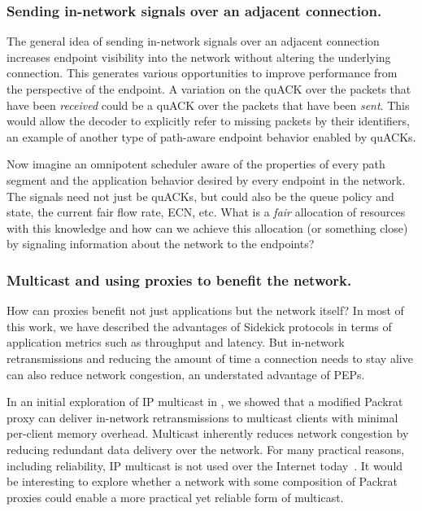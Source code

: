 \subsubsection{Sending in-network signals over an adjacent connection.}

The general idea of sending in-network signals over an adjacent connection
increases endpoint visibility into the network without altering the underlying
connection. This generates various opportunities to improve performance from
the perspective of the endpoint. A variation on the quACK over the packets that
have been \textit{received} could be a quACK over the packets that have been
\textit{sent}. This would allow the decoder to explicitly refer to missing
packets by their identifiers, an example of another type of path-aware endpoint
behavior enabled by quACKs.

Now imagine an omnipotent scheduler aware of the properties of every path
segment and the application behavior desired by every endpoint in the network.
The signals need not just be quACKs, but could also be the queue policy and
state, the current fair flow rate, ECN, etc. What is a \textit{fair} allocation
of resources with this knowledge and how can we achieve this allocation
(or something close) by signaling information about the network to the
endpoints?

\subsubsection{Multicast and using proxies to benefit the network.}

How can proxies benefit not just applications but the network itself? In most of
this work, we have described the advantages of Sidekick protocols in terms of
application metrics such as throughput and latency. But in-network
retransmissions and reducing the amount of time a connection needs to stay
alive can also reduce network congestion, an understated advantage of PEPs.

In an initial exploration of IP multicast in , we showed that
a modified Packrat proxy can deliver in-network retransmissions to multicast
clients with minimal per-client memory overhead. Multicast inherently reduces
network congestion by reducing redundant data delivery over the network. For
many practical reasons, including reliability, IP multicast is not used over
the Internet today~\cite{diot2000deployment}. It would be interesting to explore
whether a network with some composition of Packrat proxies could enable a more
practical yet reliable form of multicast.

